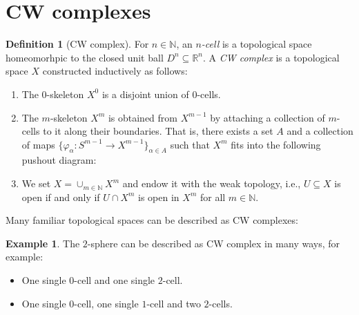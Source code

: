 \documentclass[12pt,a4paper]{amsart}
\theoremstyle{plain}
\theoremstyle{definition}
\newtheorem{defn}[thm]{Definition}
\newtheorem{exmp}[thm]{Example}
\theoremstyle{remark}
\begin{document}
\section{CW complexes}

\begin{defn}[CW complex]
  For $n \in \mathbb{N}$, an \emph{$n$-cell} is a topological space homeomorhpic to the closed unit ball $D^{n} \subseteq \mathbb{R}^{n}$.
  A \emph{CW complex} is a topological space $X$ constructed inductively as follows:
  \begin{enumerate}
    \item The $0$-skeleton $X^{0}$ is a disjoint union of $0$-cells.
    \item The $m$-skeleton $X^{m}$ is obtained from $X^{m-1}$ by attaching a collection of $m$-cells to it along their boundaries.
      That is, there exists a set $A$ and a collection of maps $\{\varphi_{\alpha} \colon S^{m-1} \to X^{m-1}\}_{\alpha \in A}$ such that $X^{m}$ fits into the following pushout diagram:
      \begin{center}
      \end{center}
    \item We set $X = \cup_{m \in \mathbb{N}} X^{m}$ and endow it with the weak topology, i.e., $U \subseteq X$ is open if and only if $U \cap X^{m}$ is open in $X^{m}$ for all $m \in \mathbb{N}$.
  \end{enumerate}
\end{defn}

Many familiar topological spaces can be described as CW complexes:

\begin{exmp}
  The $2$-sphere can be described as CW complex in many ways, for example:
  \begin{itemize}
    \item One single $0$-cell and one single $2$-cell.
    \item One single $0$-cell, one single $1$-cell and two $2$-cells.
  \end{itemize}
\end{exmp}
\end{document}
